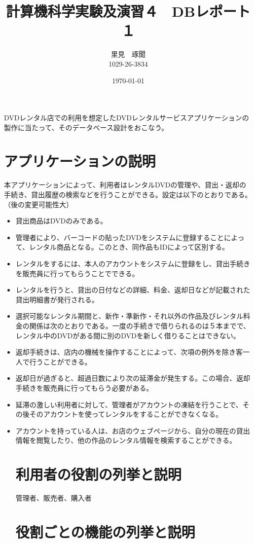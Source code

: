 \documentclass[a4]{jsarticle}
\title{計算機科学実験及演習４　DBレポート１}
\author{里見　琢聞\\1029-26-3834}
\date{\today}
\begin{document}
\maketitle
DVDレンタル店での利用を想定したDVDレンタルサービスアプリケーションの製作に当たって、そのデータベース設計をおこなう。
\section{アプリケーションの説明}
本アプリケーションによって、利用者はレンタルDVDの管理や、貸出・返却の手続き、貸出履歴の検索などを行うことができる。設定は以下のとおりである。（後の変更可能性大）
\begin{itemize}
\item 貸出商品はDVDのみである。
\item 管理者により、バーコードの貼ったDVDをシステムに登録することによって、レンタル商品となる。このとき、同作品もIDによって区別する。
\item レンタルをするには、本人のアカウントをシステムに登録をし、貸出手続きを販売員に行ってもらうことでできる。
\item レンタルを行うと、貸出の日付などの詳細、料金、返却日などが記載された貸出明細書が発行される。
\item 選択可能なレンタル期間と、新作・準新作・それ以外の作品及びレンタル料金の関係は次のとおりである。一度の手続きで借りられるのは５本までで、レンタル中のDVDがある間に別のDVDを新しく借りることはできない。
\item 返却手続きは、店内の機械を操作することによって、次項の例外を除き客一人で行うことができる。
\item 返却日が過ぎると、超過日数により次の延滞金が発生する。この場合、返却手続きを販売員に行ってもらう必要がある。
\item 延滞の激しい利用者に対して、管理者がアカウントの凍結を行うことで、その後そのアカウントを使ってレンタルをすることができなくなる。
\item アカウントを持っている人は、お店のウェブページから、自分の現在の貸出情報を閲覧したり、他の作品のレンタル情報を検索することができる。
\section{利用者の役割の列挙と説明}
管理者、販売者、購入者
\section{役割ごとの機能の列挙と説明}

\end{itemize}
\end{document}
